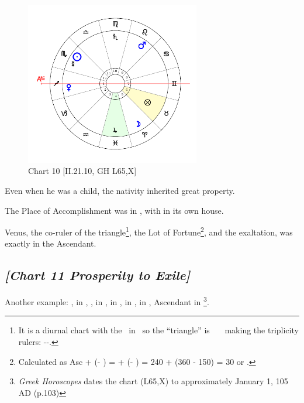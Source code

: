\clearpage
\begin{figure}
\centering
\vspace{-20pt}
\includegraphics[width=0.68\textwidth]{charts/2_21_10}
\caption{Chart 10 [II.21.10, GH L65,X]}
\label{fig:chart10}
\end{figure}

Even when he was a child, the nativity inherited great property. 

The Place of Accomplishment was in \Pisces, with \Jupiter\xspace in its own house. 

Venus, the co-ruler of the triangle\footnote{It is a diurnal chart with the \Sun\, in \Scorpio\, so the ``triangle'' is \Cancer\, \Scorpio\, \Pisces\, making the triplicity rulers: \Venus-\Mars-\Moon.}, the Lot of Fortune\footnote{Calculated as Asc + (\Moon\xspace\xspace - \Sun) = \Sagittarius\xspace + (\Aries\xspace - \Virgo) = 240 + (360 - 150) = 30 or \Taurus.}, and the exaltation, was exactly in the Ascendant.
\clearpage

\newpage
\subsection*{\textit{[Chart 11 Prosperity to Exile]}}

Another example: \Sun, \Mercury\xspace in \Capricorn, \Moon, \Saturn\xspace in \Sagittarius, \Jupiter\xspace in \Cancer, \Mars\xspace in \Virgo, \Venus\xspace in \Aquarius, Ascendant in \Libra
\footnote{\textit{Greek Horoscopes} dates the chart (L65,X) to approximately January 1, 105 AD (p.103)}.


